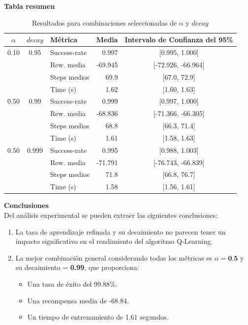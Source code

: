 \newpage
\textbf{Tabla resumen}

\begin{table}[H]
    \centering
    \begin{tabular}{|c|c|l|r|c|}
    \hline
    $\alpha$ & $decay$ & Métrica        & Media    & Intervalo de Confianza del 95\% \\
    \hline
    0.10 & 0.95 & Success-rate  & 0.997   & [0.995, 1.000] \\
         &      & Rew. media    & -69.945 & [-72.926, -66.964] \\
         &      & Steps medios  & 69.9    & [67.0, 72.9] \\
         &      & Time (s)      & 1.62    & [1.60, 1.63] \\
    \hline
    0.50 & 0.99 & Success-rate  & 0.999   & [0.997, 1.000] \\
         &      & Rew. media    & -68.836 & [-71.366, -66.305] \\
         &      & Steps medios  & 68.8    & [66.3, 71.4] \\
         &      & Time (s)      & 1.61    & [1.58, 1.63] \\
    \hline
    0.50 & 0.999 & Success-rate  & 0.995   & [0.988, 1.003] \\
         &       & Rew. media    & -71.791 & [-76.743, -66.839] \\
         &       & Steps medios  & 71.8    & [66.8, 76.7] \\
         &       & Time (s)      & 1.58    & [1.56, 1.61] \\
    \hline
    \end{tabular}
    \caption{Resultados para combinaciones seleccionadas de $\alpha$ y $decay$}
    \label{tab:resultados_seleccionados}
\end{table}

    
\textbf{Conclusiones}
\\

Del análisis experimental se pueden extraer las siguientes conclusiones:

\begin{enumerate}
    \item La tasa de aprendizaje refinada y su decaimiento no parecen tener un impacto significativo en el rendimiento del algoritmo Q-Learning.
    \item La mejor combinación general considerando todas los métricas es $\alpha = \textbf{0.5}$ y su decaimiento = \textbf{0.99}, que proporciona:
    \begin{itemize}
        \item Una tasa de éxito del 99.88\%.
        \item Una recompensa media de -68.84.
        \item Un tiempo de entrenamiento de 1.61 segundos.
    \end{itemize}
\end{enumerate}

